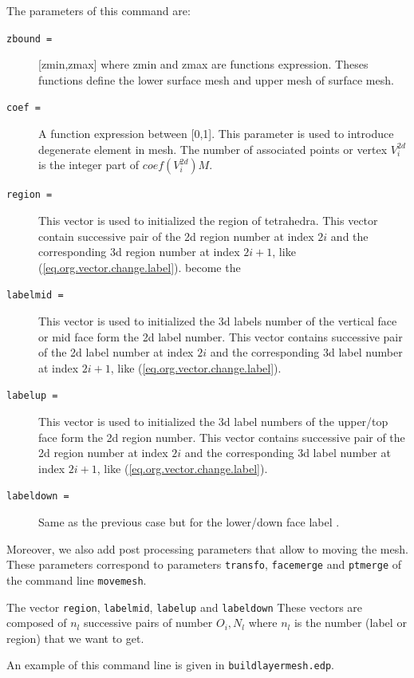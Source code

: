 \documentclass[a4paper,twoside,12pt]{book}
\begin{document}
The parameters of this command are:
\begin{description}
\item [\texttt{zbound  =}] [zmin,zmax] where zmin and zmax are functions expression. Theses functions define the lower surface mesh and upper mesh of surface mesh.
\item [\texttt{coef    =}] A function expression between [0,1]. This parameter is used to introduce degenerate element in mesh.
The number of associated points or vertex $V_{i}^{2d}$ is the integer part of $coef(V_{i}^{2d}) M$.
\item [\texttt{region  =}] This vector is used to initialized the region of tetrahedra. This vector contain  successive pair of  the  2d region number at index $2i$ and the corresponding    3d region number at index $2i+1$, like (\ref{eq.org.vector.change.label}).
become the
\item [\texttt{labelmid =}] This vector is used to initialized the 3d labels number  of the vertical face or mid face form the 2d
label number.   This vector contains  successive pair of the  2d label number
at index $2i$ and the corresponding   3d label number at index $2i+1$, like (\ref{eq.org.vector.change.label}).

\item [\texttt{labelup  =}] This vector is used to initialized the 3d label numbers  of the upper/top face form the 2d
region number.   This vector contains  successive pair of the  2d region number
at index $2i$ and the corresponding  3d label number at index $2i+1$, like (\ref{eq.org.vector.change.label}).

\item [\texttt{labeldown =}] Same as the previous case but for the lower/down face label .
\end{description}

Moreover, we also add post processing parameters that allow to moving the mesh. These parameters correspond to parameters
\texttt{transfo}, \texttt{facemerge} and \texttt{ptmerge} of the command line \texttt{movemesh}.

The vector \texttt{region}, \texttt{labelmid}, \texttt{labelup} and \texttt{labeldown} These vectors are composed of $n_{l}$ successive pairs of number $O_i,N_l$  where $n_{l}$ is the number (label or region)
that we want to get.

An example of this command line is given in \texttt{buildlayermesh.edp}.
\end{document}
